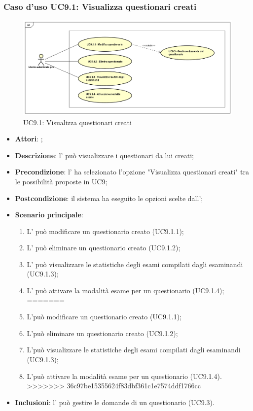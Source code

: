 		\subsubsection{Caso d'uso UC9.1: Visualizza questionari creati}
		\label{UC9.1}
		\begin{figure}[h]
			\centering
		\includegraphics[scale=0.5,keepaspectratio]{UML/UC9_1.png}
			\caption{UC9.1: Visualizza questionari creati}
		\end{figure}
		\FloatBarrier
		\begin{itemize}
			\item \textbf{Attori}: \uaupro{};
			\item \textbf{Descrizione}: l'\uaupro{} può visualizzare i questionari da lui creati;
			\item \textbf{Precondizione}: l'\uaupro{} ha selezionato l'opzione "Visualizza questionari creati" tra le possibilità proposte in UC9;
			\item \textbf{Postcondizione}: il sistema ha eseguito le opzioni scelte dall'\uaupro{};
			\item \textbf{Scenario principale}: 
				\begin{enumerate}
<<<<<<< HEAD
					\item L'\uaupro{} può modificare un questionario creato (UC9.1.1);
					\item L'\uaupro{} può eliminare un questionario creato (UC9.1.2);
					\item L'\uaupro{} può visualizzare le statistiche degli esami compilati dagli esaminandi (UC9.1.3);
					\item L'\uaupro{} può attivare la modalità esame per un questionario (UC9.1.4);
=======
					\item L'\uaupro può modificare un questionario creato (UC9.1.1);
					\item L'\uaupro può eliminare un questionario creato (UC9.1.2);
					\item L'\uaupro può visualizzare le statistiche degli esami compilati dagli esaminandi (UC9.1.3);
					\item L'\uaupro può attivare la modalità esame per un questionario (UC9.1.4).
>>>>>>> 36c97be15355624f83dbf361c1e7574ddf1766cc
				\end{enumerate}
				\item \textbf{Inclusioni}: l'\uaupro{} può gestire le domande di un questionario (UC9.3).
		\end{itemize}
		
